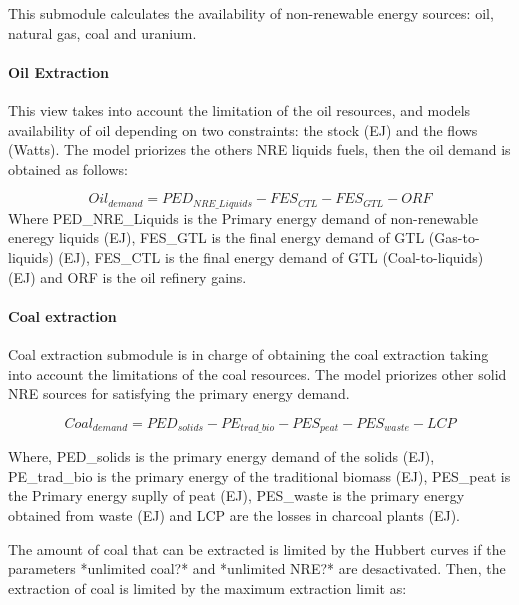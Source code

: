 

This submodule calculates the availability of non-renewable energy sources: oil, natural gas, coal and uranium.

\paragraph{Oil Extraction}
This view takes into account the limitation of the oil resources, and models availability of oil depending on two constraints: the stock (EJ) and the flows (Watts). The model priorizes the others NRE liquids fuels, then the oil demand is obtained as follows:

\begin{equation}
Oil_{demand}=PED_{NRE\_Liquids}-FES_{CTL}- FES_{GTL}- ORF
\end{equation}
Where PED\_NRE\_Liquids is the Primary energy demand of non-renewable eneregy liquids (EJ), FES\_GTL is the final energy demand of GTL (Gas-to-liquids) (EJ),  FES\_CTL is the final energy demand of GTL (Coal-to-liquids) (EJ) and ORF is the oil refinery gains.

\paragraph{Coal extraction}

Coal extraction submodule is in charge of obtaining the coal extraction taking into account the limitations of the coal resources. The model priorizes other solid NRE sources for satisfying the primary energy demand.

\begin{equation}
Coal_{demand}=PED_{solids}-PE_{trad\_bio}-PES_{peat}-PES_{waste}-LCP
\end{equation}

Where, PED\_solids is the primary energy demand of the solids (EJ), PE\_trad\_bio is the primary energy of the traditional biomass (EJ), PES\_peat is the Primary energy suplly of peat (EJ), PES\_waste is the primary energy obtained from waste (EJ) and LCP are the losses in charcoal plants (EJ).

The amount of coal that can be extracted is limited by the Hubbert curves if the parameters *unlimited coal?* and *unlimited NRE?* are desactivated. Then, the extraction of coal is limited by the maximum extraction limit as:

